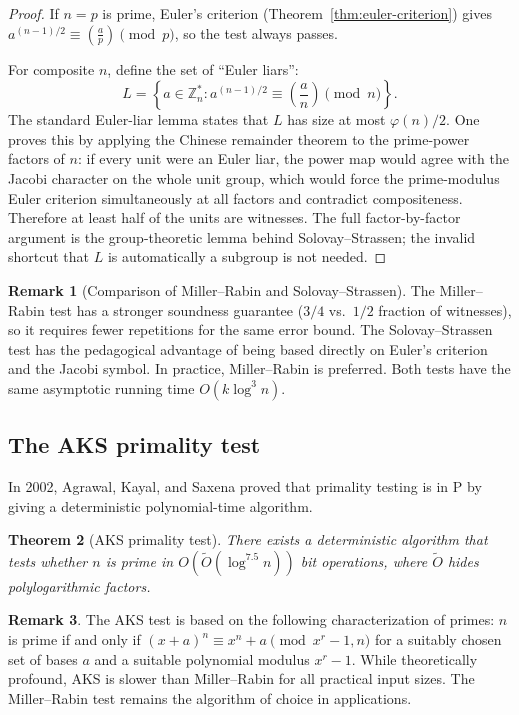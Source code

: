 \documentclass[twoside,12pt]{book}
\theoremstyle{plain}
\newtheorem{theorem}{Theorem}[chapter]
\theoremstyle{definition}
\newtheorem{remark}[theorem]{Remark}
\theoremstyle{remark}
\begin{document}
\begin{proof}
If $n = p$ is prime, Euler's criterion (Theorem~\ref{thm:euler-criterion}) gives $a^{(n-1)/2} \equiv \left(\frac{a}{p}\right) \pmod{p}$, so the test always passes.

For composite $n$, define the set of ``Euler liars'':
\[
L = \left\{a \in \mathbb{Z}_n^* : a^{(n-1)/2} \equiv \left(\frac{a}{n}\right) \pmod{n}\right\}.
\]
The standard Euler-liar lemma states that $L$ has size at most
$\varphi(n)/2$. One proves this by applying the Chinese remainder theorem to
the prime-power factors of $n$: if every unit were an Euler liar, the power
map would agree with the Jacobi character on the whole unit group, which
would force the prime-modulus Euler criterion simultaneously at all factors
and contradict compositeness. Therefore at least half of the units are
witnesses. The full factor-by-factor argument is the group-theoretic lemma
behind Solovay--Strassen; the invalid shortcut that $L$ is automatically a
subgroup is not needed.
\end{proof}

\begin{remark}[Comparison of Miller--Rabin and Solovay--Strassen]
The Miller--Rabin test has a stronger soundness guarantee ($3/4$ vs.\ $1/2$ fraction of witnesses), so it requires fewer repetitions for the same error bound. The Solovay--Strassen test has the pedagogical advantage of being based directly on Euler's criterion and the Jacobi symbol. In practice, Miller--Rabin is preferred. Both tests have the same asymptotic running time $O(k \log^3 n)$.
\end{remark}

\subsection{The AKS primality test}

In 2002, Agrawal, Kayal, and Saxena proved that primality testing is in $\text{P}$ by giving a deterministic polynomial-time algorithm.

\begin{theorem}[AKS primality test]
\label{thm:aks}
There exists a deterministic algorithm that tests whether $n$ is prime in $O(\tilde{O}(\log^{7.5} n))$ bit operations, where $\tilde{O}$ hides polylogarithmic factors.
\end{theorem}

\begin{remark}
The AKS test is based on the following characterization of primes: $n$ is prime if and only if $(x + a)^n \equiv x^n + a \pmod{x^r - 1, n}$ for a suitably chosen set of bases $a$ and a suitable polynomial modulus $x^r - 1$. While theoretically profound, AKS is slower than Miller--Rabin for all practical input sizes. The Miller--Rabin test remains the algorithm of choice in applications.
\end{remark}
\end{document}
